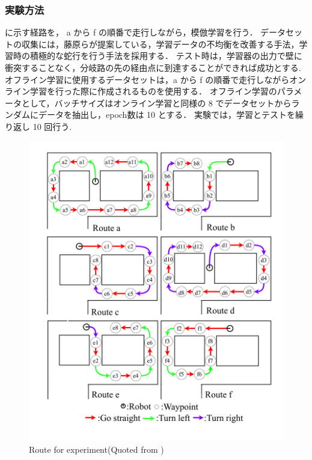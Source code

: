 \clearpage
\subsubsection{実験方法}
に示す経路を， a から f の順番で走行しながら，模倣学習を行う．
データセットの収集には，藤原ら\cite{fujiwara2023}が提案している，学習データの不均衡を改善する手法，学習時の積極的な蛇行を行う手法を採用する．
テスト時は，学習器の出力で壁に衝突することなく，分岐路の先の経由点に到達することができれば成功とする.
オフライン学習に使用するデータセットは，a から f の順番で走行しながらオンライン学習を行った際に作成されるものを使用する．
オフライン学習のパラメータとして，バッチサイズはオンライン学習と同様の 8 でデータセットからランダムにデータを抽出し，epoch数は 10 とする．
実験では，学習とテストを繰り返し 10 回行う.

\begin{figure}
  \centering
  \includegraphics[width=130mm]{images/pdf/fujiwara/route.pdf}
  \caption[Route for experiment]{Route for experiment(Quoted from \cite{fujiwara2023})}
  \label{fig:fujiwara_route}
\end{figure}

